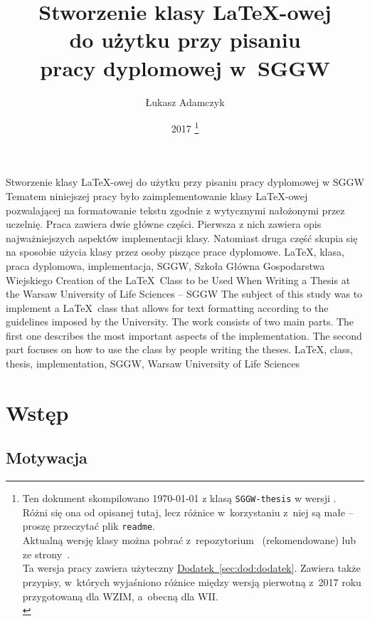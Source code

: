 \documentclass{SGGW-thesis}
\title{Stworzenie klasy \LaTeX-owej\\do użytku przy pisaniu\\pracy dyplomowej w~SGGW}
\author{Łukasz Adamczyk}
\date{2017%
\footnote{Ten dokument skompilowano \today{} z klasą {\tt SGGW-thesis} w wersji \SGGWthesisVersion. Różni się ona od opisanej tutaj, lecz różnice w~korzystaniu z~niej są małe -- proszę przeczytać plik {\tt readme}.\\
\indent Aktualną wersję klasy można pobrać z~repozytorium~\cite{klasa-github} (rekomendowane) lub ze strony~\cite{www-LC-klasaLaTeX}.\\
\indent Ta wersja pracy zawiera użyteczny \hyperref[sec:dod:dodatek]{Dodatek~}\ref{sec:dod:dodatek}. Zawiera także przypisy, w~których wyjaśniono różnice między wersją pierwotną z~2017 roku przygotowaną dla WZIM, a~obecną dla WII.\\
\indent {\bf W~Państwa pracach należy usunąć cały ten przypis.}}%
}
\begin{document}
\maketitle
\statementpage
\abstractpage
{Stworzenie klasy \LaTeX-owej do użytku przy pisaniu pracy dyplomowej w SGGW}
{Tematem niniejszej pracy było zaimplementowanie klasy \LaTeX-owej pozwalającej na formatowanie tekstu zgodnie z wytycznymi nałożonymi przez uczelnię. Praca zawiera dwie
główne części. Pierwsza z nich zawiera opis najważniejszych aspektów implementacji klasy. Natomiast druga część skupia się na sposobie użycia klasy przez osoby piszące prace
dyplomowe.}
{LaTeX, klasa, praca dyplomowa, implementacja, SGGW, Szkoła Główna Gospodarstwa Wiejskiego}
{Creation of the \LaTeX\ Class to be Used When Writing a Thesis at the Warsaw University of Life Sciences -- SGGW}
{The subject of this study was to implement a \LaTeX\ class that allows for text formatting according to the guidelines imposed by the University. The work consists of two
main parts. The first one describes the most important aspects of the implementation. The second part focuses on how to use the class by people writing the theses.}
{LaTeX, class, thesis, implementation, SGGW, Warsaw University of Life Sciences}


{
  \doublespacing
  \tableofcontents
}

\startchapterfromoddpage %

\chapter{Wstęp}

\section{Motywacja}
\label{sec:motywacja}
\end{document}
